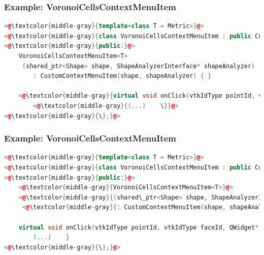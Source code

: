 \documentclass[compress]{beamer}
\begin{document}
\begin{frame}[fragile]
  \frametitle{Example: VoronoiCellsContextMenuItem}
  
\begin{lstlisting}[language=C++, keywordstyle=\color{blue},
                stringstyle=\color{red},
                commentstyle=\color{green}, numbers=none]
<@\textcolor{middle-gray}{template<class T = Metric>}@>
<@\textcolor{middle-gray}{class VoronoiCellsContextMenuItem : public CustomContextMenuItem \{}@>
<@\textcolor{middle-gray}{public:}@>
	VoronoiCellsContextMenuItem<T>
	 (shared_ptr<Shape> shape, ShapeAnalyzerInterface* shapeAnalyzer)
	 	: CustomContextMenuItem(shape, shapeAnalyzer) { }
    
    <@\textcolor{middle-gray}{virtual void onClick(vtkIdType pointId, vtkIdType faceId, QWidget* parent) \{}@>
        <@\textcolor{middle-gray}{(...)    \}}@>
<@\textcolor{middle-gray}{\};}@>
\end{lstlisting}
  
\end{frame}

\begin{frame}[fragile]
  \frametitle{Example: VoronoiCellsContextMenuItem}
  
\begin{lstlisting}[language=C++, keywordstyle=\color{blue},
                stringstyle=\color{red},
                commentstyle=\color{green}, numbers=none]
<@\textcolor{middle-gray}{template<class T = Metric>}@>
<@\textcolor{middle-gray}{class VoronoiCellsContextMenuItem : public CustomContextMenuItem \{}@>
<@\textcolor{middle-gray}{public:}@>
	<@\textcolor{middle-gray}{VoronoiCellsContextMenuItem<T>}@>
	<@\textcolor{middle-gray}{(shared\_ptr<Shape> shape, ShapeAnalyzerInterface* shapeAnalyzer)}@>
	 <@\textcolor{middle-gray}{: CustomContextMenuItem(shape, shapeAnalyzer) \{ \}}@>
    
    virtual void onClick(vtkIdType pointId, vtkIdType faceId, QWidget* parent) {
        (...)    }
<@\textcolor{middle-gray}{\};}@>
\end{lstlisting}
  
\end{frame}
\end{document}
